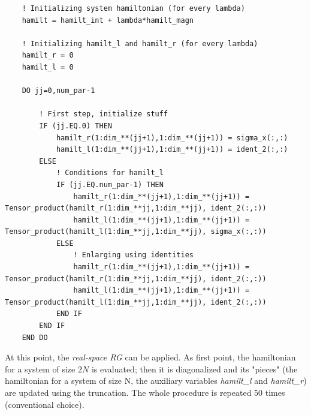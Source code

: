 \documentclass[12pt, a4paper, notitlepage]{report}
\begin{document}
\begin{lstlisting}
	! Initializing system hamiltonian (for every lambda)
	hamilt = hamilt_int + lambda*hamilt_magn
	
	! Initializing hamilt_l and hamilt_r (for every lambda)
	hamilt_r = 0
	hamilt_l = 0
	
	DO jj=0,num_par-1
		
		! First step, initialize stuff
		IF (jj.EQ.0) THEN
			hamilt_r(1:dim_**(jj+1),1:dim_**(jj+1)) = sigma_x(:,:)
			hamilt_l(1:dim_**(jj+1),1:dim_**(jj+1)) = ident_2(:,:)
		ELSE
			! Conditions for hamilt_l
			IF (jj.EQ.num_par-1) THEN
				hamilt_r(1:dim_**(jj+1),1:dim_**(jj+1)) = Tensor_product(hamilt_r(1:dim_**jj,1:dim_**jj), ident_2(:,:))
				hamilt_l(1:dim_**(jj+1),1:dim_**(jj+1)) = Tensor_product(hamilt_l(1:dim_**jj,1:dim_**jj), sigma_x(:,:))
			ELSE
				! Enlarging using identities
				hamilt_r(1:dim_**(jj+1),1:dim_**(jj+1)) = Tensor_product(hamilt_r(1:dim_**jj,1:dim_**jj), ident_2(:,:))
				hamilt_l(1:dim_**(jj+1),1:dim_**(jj+1)) = Tensor_product(hamilt_l(1:dim_**jj,1:dim_**jj), ident_2(:,:))
			END IF
		END IF
	END DO

\end{lstlisting}

At this point, the \textit{real-space RG} can be applied. As first point, the hamiltonian for a system of size $2N$ is evaluated; then it is diagonalized and its "pieces" (the hamiltonian for a system of size N, the auxiliary variables \textit{hamilt\_l} and \textit{hamilt\_r}) are updated using the truncation. The whole procedure is repeated 50 times (conventional choice).
\end{document}
